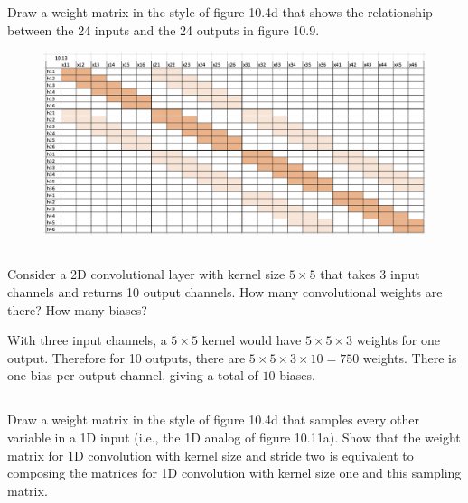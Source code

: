\documentclass[12pt]{report}
\begin{document}
\subsection{}
\begin{mdframed}
    Draw a weight matrix in the style of figure 10.4d that shows the relationship between the 24 inputs and the 24 outputs in figure 10.9.
\end{mdframed}

\begin{figure}[ht]
    \centering
    \includegraphics[width=1\textwidth]{10_13.png}
    \label{fig:udl_chap10_fig3}
\end{figure}


\subsection{}
\begin{mdframed}
    Consider a 2D convolutional layer with kernel size $5\times5$ that takes 3 input channels and returns 10 output channels. How many convolutional weights are there? How many biases?
\end{mdframed}

With three input channels, a $5\times5$ kernel would have $5\times5\times3$ weights for one output. Therefore for 10 outputs, there are $5\times5\times3\times10 = 750$ weights. There is one bias per output channel, giving a total of $10$ biases.

\subsection{}
\begin{mdframed}
    Draw a weight matrix in the style of figure 10.4d that samples every other variable in a 1D input (i.e., the 1D analog of figure 10.11a). Show that the weight matrix for 1D convolution with kernel size and stride two is equivalent to composing the matrices for 1D convolution with kernel size one and this sampling matrix.
\end{mdframed}
\end{document}
